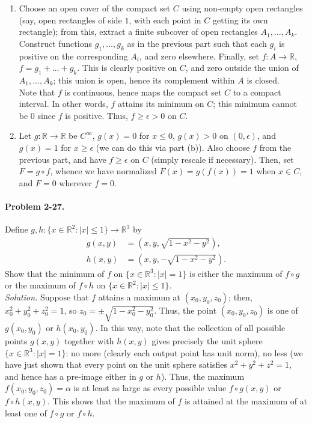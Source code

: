 \documentclass[11pt]{report}
\newcommand{\R}{\mathbb{R}}
\newcommand{\problem}[1]{\paragraph{Problem #1.}}
\newcommand{\solution}{\noindent\textit{Solution.} }
\begin{document}
\begin{enumerate}
        \item Choose an open cover of the compact set $C$ using non-empty open
        rectangles (say, open rectangles of side $1$, with each point in $C$ getting
        its own rectangle); from this, extract a finite subcover of open rectangles
        $A_1, \dots, A_k$.  Construct functions $g_1, \dots, g_k$ as in the previous
        part such that each $g_i$ is positive on the corresponding $A_i$, and zero
        elsewhere. Finally, set $f\colon A \to \R$, $f = g_1 + \dots + g_k$. This is
        clearly positive on $C$, and zero outside the union of $A_1, \dots, A_k$;
        this union is open, hence its complement within $A$ is closed. \\

        Note that $f$ is continuous, hence maps the compact set $C$ to a compact
        interval. In other words, $f$ attains its minimum on $C$; this minimum cannot
        be $0$ since $f$ is positive. Thus, $f \geq \epsilon > 0$ on $C$.


        \item Let $g\colon \R \to \R$ be $C^\infty$, $g(x) = 0$ for $x \leq 0$, $g(x)
        > 0$ on $(0, \epsilon)$, and $g(x) = 1$ for $x \geq \epsilon$ (we can do this
        via part (b)). Also choose $f$ from the previous part, and have $f \geq
        \epsilon$ on $C$ (simply rescale if necessary). Then, set $F = g\circ f$,
        whence we have normalized $F(x) = g(f(x)) = 1$ when $x \in C$, and $F = 0$
        wherever $f = 0$.
    \end{enumerate}


    \problem{2-27} Define $g, h \colon \{x \in \R^2: |x| \leq 1\} \to \R^3$ by
    \begin{align*}
        g(x, y) &= (x, y, \sqrt{1 - x^2 - y^2}), \\
        h(x, y) &= (x, y, -\sqrt{1 - x^2 - y^2}).
    \end{align*}
    Show that the minimum of $f$ on $\{x\in \R^3: |x| = 1\}$ is either the maximum of
    $f\circ g$ or the maximum of $f\circ h$ on $\{x\in \R^2: |x| \leq 1\}$. \\

    \solution Suppose that $f$ attains a maximum at $(x_0, y_0, z_0)$; then, $x_0^2 +
    y_0^2 + z_0^2 = 1$, so $z_0 = \pm\sqrt{1 - x_0^2 - y_0^2}$. Thus, the point
    $(x_0, y_0, z_0)$ is one of $g(x_0, y_0)$ or $h(x_0, y_0)$. In this way, note
    that the collection of all possible points $g(x, y)$ together with $h(x, y)$
    gives precisely the unit sphere $\{x \in \R^3: |x| = 1\}$: no more (clearly each
    output point has unit norm), no less (we have just shown that every point on the
    unit sphere satisfies $x^2 + y^2 + z^2 = 1$, and hence has a pre-image either in
    $g$ or $h$). Thus, the maximum $f(x_0, y_0, z_0) = \alpha$ is at least as large
    as every possible value $f\circ g (x, y)$ or $f\circ h (x, y)$. This shows that
    the maximum of $f$ is attained at the maximum of at least one of $f\circ g$ or
    $f\circ h$.
\end{document}
